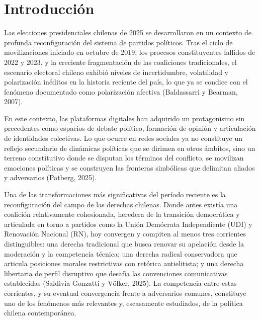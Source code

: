 \documentclass[
  letterpaper,
  numbers=noendperiod,
  fontsize=11pt,
  DIV=12,
  titlepage=false]{scrreprt}
\begin{document}
\pagestyle{fancy}


\chapter{Introducción}\label{introducciuxf3n}

Las elecciones presidenciales chilenas de 2025 se desarrollaron en un
contexto de profunda reconfiguración del sistema de partidos políticos.
Tras el ciclo de movilizaciones iniciado en octubre de 2019, los
procesos constituyentes fallidos de 2022 y 2023, y la creciente
fragmentación de las coaliciones tradicionales, el escenario electoral
chileno exhibió niveles de incertidumbre, volatilidad y polarización
inéditos en la historia reciente del país, lo que ya se condice con el
fenómeno documentado como polarización afectiva (Baldassarri y Bearman,
2007).

En este contexto, las plataformas digitales han adquirido un
protagonismo sin precedentes como espacios de debate político, formación
de opinión y articulación de identidades colectivas. Lo que ocurre en
redes sociales ya no constituye un reflejo secundario de dinámicas
políticas que se dirimen en otros ámbitos, sino un terreno constitutivo
donde se disputan los términos del conflicto, se movilizan emociones
políticas y se construyen las fronteras simbólicas que delimitan aliados
y adversarios (Patberg, 2025).

Una de las transformaciones más significativas del período reciente es
la reconfiguración del campo de las derechas chilenas. Donde antes
existía una coalición relativamente cohesionada, heredera de la
transición democrática y articulada en torno a partidos como la Unión
Demócrata Independiente (UDI) y Renovación Nacional (RN), hoy convergen
y compiten al menos tres corrientes distinguibles: una derecha
tradicional que busca renovar su apelación desde la moderación y la
competencia técnica; una derecha radical conservadora que articula
posiciones morales restrictivas con retórica antielitista; y una derecha
libertaria de perfil disruptivo que desafía las convenciones
comunicativas establecidas (Saldivia Gonzatti y Völker, 2025). La
competencia entre estas corrientes, y su eventual convergencia frente a
adversarios comunes, constituye uno de los fenómenos más relevantes y,
escasamente estudiados, de la política chilena contemporánea.
\end{document}
